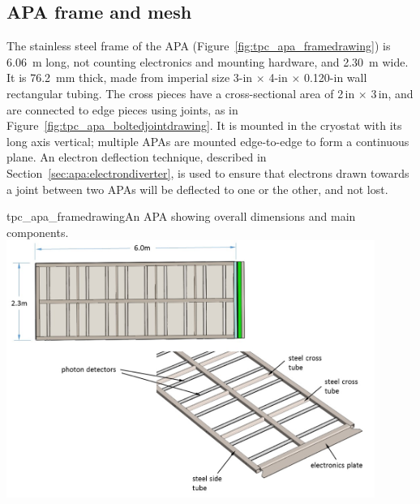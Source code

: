\subsection{APA frame and mesh}
\label{subsec:apa_frame}


The stainless steel frame of the APA (Figure~\ref{fig:tpc_apa_framedrawing}) is 6.06~m long, not counting electronics and mounting hardware, and 2.30~m wide.  It is 76.2~mm thick, made from imperial size 3-in $\times$ 4-in $\times$ 0.120-in wall rectangular tubing.  The cross pieces have a cross-sectional area of 2\,in $\times$ 3\,in, and are connected to edge pieces using joints, as in Figure~\ref{fig:tpc_apa_boltedjointdrawing}.  It is mounted in the cryostat with its long axis vertical; multiple APAs are mounted edge-to-edge to form a continuous plane. An electron deflection technique, described in Section~\ref{sec:apa:electrondiverter}, is used to ensure that electrons drawn towards a joint between two APAs will be deflected to one or the other, and not lost.

\begin{cdrfigure}{tpc_apa_framedrawing}{An APA showing overall dimensions and main components. }
\includegraphics[width=0.9\textwidth]{figures/tpc_apa_framedrawing.png} 
\end{cdrfigure}


